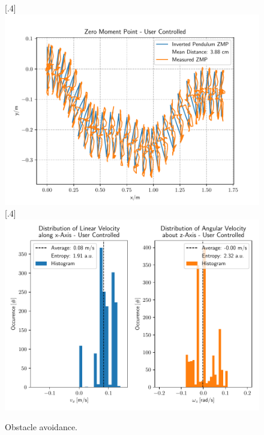 \begin{figure}[h]
	\centering
	[.4\linewidth]{\includegraphics[scale=.35]{chapters/05_experiments/01_user_controlled_walking/02_test_environment/obstacle_walk_02_zmp.pdf}}
	[.4\linewidth]{\includegraphics[scale=.35]{chapters/05_experiments/01_user_controlled_walking/02_test_environment/obstacle_walk_02_entropy.pdf}}
	\caption{Obstacle avoidance.}
	\label{fig::512_uc_obstacle}
\end{figure} 
